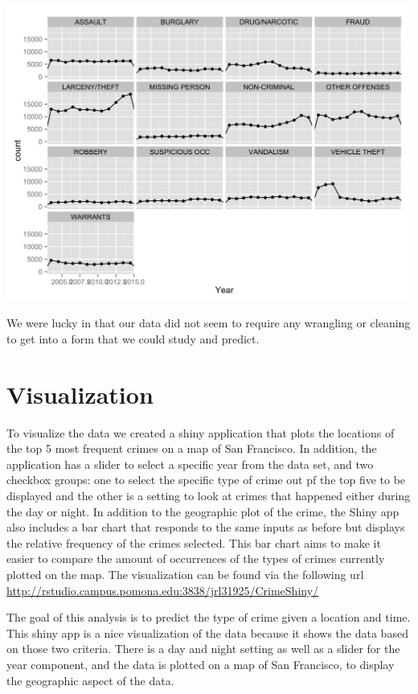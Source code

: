 \documentclass[11pt]{article}
\begin{document}
\includegraphics{categories.png}

We were lucky in that our data did not seem to require any wrangling or cleaning to get into a form that we could study and predict.

\section*{Visualization}

To visualize the data we created a shiny application that plots the locations of the top 5 most frequent crimes on a map of San Francisco. In addition, the application has a slider to select a specific year from the data set, and two checkbox groups: one to select the specific type of crime out pf the top five to be displayed and the other is a setting to look at crimes that happened either during the day or night. In addition to the geographic plot of the crime, the Shiny app also includes a bar chart that responds to the same inputs as before but displays the relative frequency of the crimes selected. This bar chart aims to make it easier to compare the amount of occurrences of the types of crimes currently plotted on the map. The visualization can be found via the following url \url{http://rstudio.campus.pomona.edu:3838/jrl31925/CrimeShiny/}
 

The goal of this analysis is to predict the type of crime given a location and time. This shiny app is a nice visualization of the data because it shows the data based on those two criteria. There is a day and night setting as well as a slider for the year component, and the data is plotted on a map of San Francisco, to display the geographic aspect of the data. 
\end{document}
